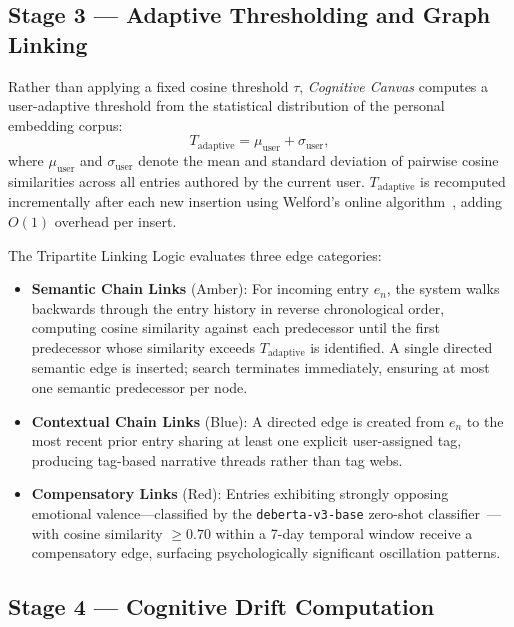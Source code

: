 \documentclass[12pt, letterpaper]{article}
\newcommand{\CC}{\textit{Cognitive Canvas}}
\begin{document}
\subsection{Stage 3 --- Adaptive Thresholding and Graph Linking}

Rather than applying a fixed cosine threshold $\tau$, \CC{}
computes a user-adaptive threshold from the statistical
distribution of the personal embedding corpus:
\begin{equation}
T_{\mathrm{adaptive}} = \mu_{\mathrm{user}} + \sigma_{\mathrm{user}},
\label{eq:adaptive}
\end{equation}
where $\mu_{\mathrm{user}}$ and $\sigma_{\mathrm{user}}$
denote the mean and standard deviation of pairwise cosine
similarities across all entries authored by the current user.
$T_{\mathrm{adaptive}}$ is recomputed incrementally after each
new insertion using Welford's online
algorithm~\cite{welford1962}, adding $O(1)$ overhead per
insert.

The Tripartite Linking Logic evaluates three edge categories:

\begin{itemize}
  \item \textbf{Semantic Chain Links} (Amber):
    For incoming entry $e_n$, the system walks backwards
    through the entry history in reverse chronological order,
    computing cosine similarity against each predecessor until
    the first predecessor whose similarity exceeds
    $T_{\mathrm{adaptive}}$ is identified.
    A single directed semantic edge is inserted; search
    terminates immediately, ensuring at most one semantic
    predecessor per node.

  \item \textbf{Contextual Chain Links} (Blue):
    A directed edge is created from $e_n$ to the most recent
    prior entry sharing at least one explicit user-assigned
    tag, producing tag-based narrative threads rather than
    tag webs.

  \item \textbf{Compensatory Links} (Red):
    Entries exhibiting strongly opposing emotional
    valence---classified by the \texttt{deberta-v3-base}
    zero-shot classifier~\cite{he2021deberta}---with cosine
    similarity $\geq 0.70$ within a 7-day temporal window
    receive a compensatory edge, surfacing psychologically
    significant oscillation patterns.
\end{itemize}

\subsection{Stage 4 --- Cognitive Drift Computation}
\end{document}
